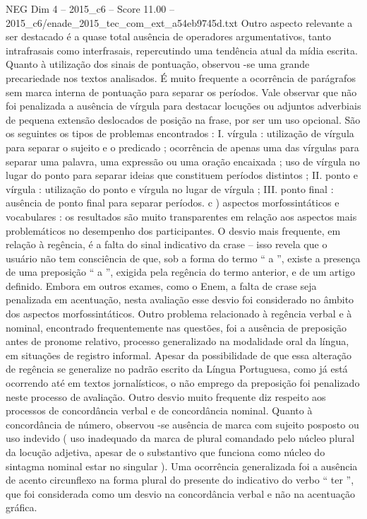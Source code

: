 \begin{textsample}{NEG Dim 4 – 2015\_c6 – Score 11.00 – 2015\_c6/enade\_2015\_tec\_com\_ext\_a54eb9745d.txt}
Outro aspecto relevante a ser destacado é a quase total ausência de operadores argumentativos, tanto intrafrasais como interfrasais, repercutindo uma tendência atual da mídia escrita.
Quanto à utilização dos sinais de pontuação, observou -se uma grande precariedade nos textos analisados.
É muito frequente a ocorrência de parágrafos sem marca interna de pontuação para separar os períodos.
Vale observar que não foi penalizada a ausência de vírgula para destacar locuções ou adjuntos adverbiais de pequena extensão deslocados de posição na frase, por ser um uso opcional.
São os seguintes os tipos de problemas encontrados : I. vírgula : utilização de vírgula para separar o sujeito e o predicado ; ocorrência de apenas uma das vírgulas para separar uma palavra, uma expressão ou uma oração encaixada ; uso de vírgula no lugar do ponto para separar ideias que constituem períodos distintos ; II. ponto e vírgula : utilização do ponto e vírgula no lugar de vírgula ; III. ponto final : ausência de ponto final para separar períodos. c ) aspectos morfossintáticos e vocabulares : os resultados são muito transparentes em relação aos aspectos mais problemáticos no desempenho dos participantes.
O desvio mais frequente, em relação à regência, é a falta do sinal indicativo da crase – isso revela que o usuário não tem consciência de que, sob a forma do termo “ a ”, existe a presença de uma preposição “ a ”, exigida pela regência do termo anterior, e de um artigo definido.
Embora em outros exames, como o Enem, a falta de crase seja penalizada em acentuação, nesta avaliação esse desvio foi considerado no âmbito dos aspectos morfossintáticos.
Outro problema relacionado à regência verbal e à nominal, encontrado frequentemente nas questões, foi a ausência de preposição antes de pronome relativo, processo generalizado na modalidade oral da língua, em situações de registro informal.
Apesar da possibilidade de que essa alteração de regência se generalize no padrão escrito da Língua Portuguesa, como já está ocorrendo até em textos jornalísticos, o não emprego da preposição foi penalizado neste processo de avaliação.
Outro desvio muito frequente diz respeito aos processos de concordância verbal e de concordância nominal.
Quanto à concordância de número, observou -se ausência de marca com sujeito posposto ou uso indevido ( uso inadequado da marca de plural comandado pelo núcleo plural da locução adjetiva, apesar de o substantivo que funciona como núcleo do sintagma nominal estar no singular ).
Uma ocorrência generalizada foi a ausência de acento circunflexo na forma plural do presente do indicativo do verbo “ ter ”, que foi considerada como um desvio na concordância verbal e não na acentuação gráfica.

\end{textsample}
